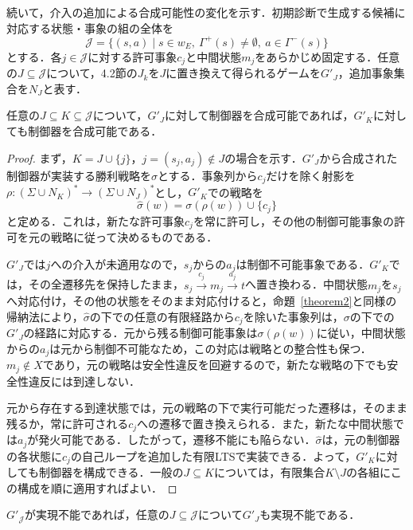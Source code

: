 続いて，介入の追加による合成可能性の変化を示す．初期診断で生成する候補に対応する状態・事象の組の全体を
\[
\mathcal{J}=\{(s,a)\mid s\in w_E,\ \Gamma^{+}(s)\neq\emptyset,\ a\in\Gamma^{-}(s)\}
\]
とする．各$j\in\mathcal{J}$に対する許可事象$c_j$と中間状態$m_j$をあらかじめ固定する．任意の$J\subseteq\mathcal{J}$について，4.2節の$J_k$を$J$に置き換えて得られるゲームを$G'_J$，追加事象集合を$N_J$と表す．

\begin{theorem}[介入追加に関する単調性]
\label{prop:intervention_monotonicity}
任意の$J\subseteq K\subseteq\mathcal{J}$について，$G'_J$に対して制御器を合成可能であれば，$G'_K$に対しても制御器を合成可能である．
\end{theorem}

\begin{proof}
まず，$K=J\cup\{j\}$，$j=(s_j,a_j)\notin J$の場合を示す．$G'_J$から合成された制御器が実装する勝利戦略を$\sigma$とする．事象列から$c_j$だけを除く射影を$\rho:(\Sigma\cup N_K)^*\to(\Sigma\cup N_J)^*$とし，$G'_K$での戦略を
\[
\widehat{\sigma}(w)=\sigma(\rho(w))\cup\{c_j\}
\]
と定める．これは，新たな許可事象$c_j$を常に許可し，その他の制御可能事象の許可を元の戦略に従って決めるものである．

$G'_J$では$j$への介入が未適用なので，$s_j$からの$a_j$は制御不可能事象である．$G'_K$では，その全遷移先を保持したまま，$s_j\xrightarrow{c_j}m_j\xrightarrow{a_j}t$へ置き換わる．中間状態$m_j$を$s_j$へ対応付け，その他の状態をそのまま対応付けると，命題~\ref{theorem2}と同様の帰納法により，$\widehat{\sigma}$の下での任意の有限経路から$c_j$を除いた事象列は，$\sigma$の下での$G'_J$の経路に対応する．元から残る制御可能事象は$\sigma(\rho(w))$に従い，中間状態からの$a_j$は元から制御不可能なため，この対応は戦略との整合性も保つ．$m_j\notin X$であり，元の戦略は安全性違反を回避するので，新たな戦略の下でも安全性違反には到達しない．

元から存在する到達状態では，元の戦略の下で実行可能だった遷移は，そのまま残るか，常に許可される$c_j$への遷移で置き換えられる．また，新たな中間状態では$a_j$が発火可能である．したがって，遷移不能にも陥らない．$\widehat{\sigma}$は，元の制御器の各状態に$c_j$の自己ループを追加した有限LTSで実装できる．よって，$G'_K$に対しても制御器を構成できる．一般の$J\subseteq K$については，有限集合$K\setminus J$の各組にこの構成を順に適用すればよい．
\end{proof}

\begin{corollary}[全候補適用後の合成不能]
\label{cor:all_candidates_failure}
$G'_{\mathcal{J}}$が実現不能であれば，任意の$J\subseteq\mathcal{J}$について$G'_J$も実現不能である．
\end{corollary}

